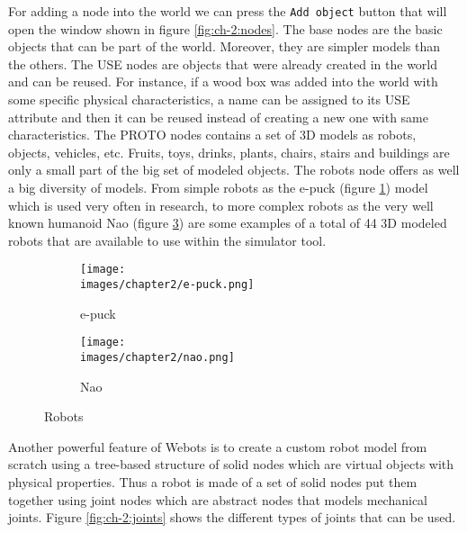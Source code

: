 For adding a node into the world we can press the \verb|Add object| button that will open the window shown in figure \ref{fig:ch-2:nodes}. The base nodes are the basic objects that can be part of the world. Moreover, they are simpler models than the others. The USE nodes are objects that were already created in the world and can be reused. For instance, if a wood box was added into the world with some specific physical characteristics, a name can be assigned to its USE attribute and then it can be reused instead of creating a new one with same characteristics. The PROTO nodes contains a set of 3D models as robots, objects, vehicles, etc. Fruits, toys, drinks, plants, chairs, stairs and buildings are only a small part of the big set of modeled objects. The robots node offers as well a big diversity of models. From simple robots as the e-puck (figure \ref{fig:ch-2:e-puck}) model which is used very often in research, to more complex robots as the very well known humanoid Nao (figure \ref{fig:ch-2:nao}) are some examples of a total of 44 3D modeled robots that are available to use within the simulator tool. 

\begin{figure}[h!]
  \centering
  \begin{subfigure}[b]{0.3\linewidth}
  	\texttt{[image: \\images/chapter2/e-puck.png]}
  	\caption{e-puck}
  	\label{fig:ch-2:e-puck}
  \end{subfigure}
  \begin{subfigure}[b]{0.35\linewidth}
  	\texttt{[image: \\images/chapter2/nao.png]}
  	\caption{Nao}
  	\label{fig:ch-2:nao}
  \end{subfigure}
  \caption{Robots}
\end{figure}

Another powerful feature of Webots is to create a custom robot model from scratch using a tree-based structure of solid nodes which are virtual objects with physical properties. Thus a robot is made of a set of solid nodes put them together using joint nodes which are abstract nodes that models mechanical joints. Figure \ref{fig:ch-2:joints} shows the different types of joints that can be used.

